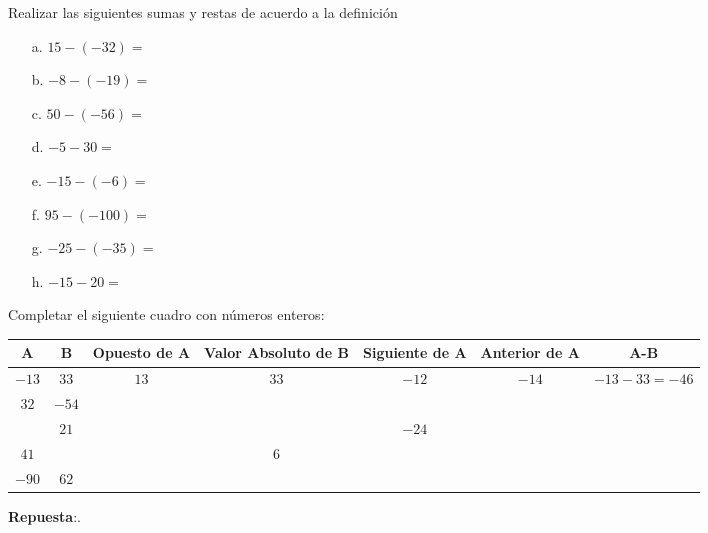 \documentclass[10pt]{examdesign}
\begin{document}
    \begin{fillin}[title={\textbf{Calculos de sumas y restas...}}, resetcounter=no, rearrange=no]
    	\begin{question}
    		Realizar las siguientes sumas y restas de acuerdo a la definición
    		\begin{itemize}
    			\item [a.] $15-(-32)=$
    			\item [b.] $-8-(-19)=$
    			\item [c.] $50-(-56)=$
    			\item [d.] $-5-30=$
    			\item [e.] $-15-(-6)=$
    			\item [f.] $95-(-100)=$
    			\item [g.] $-25-(-35)=$
    			\item [h.] $-15-20=$ 
    		\end{itemize}
    	\end{question}	        	
    \end{fillin}

    \begin{shortanswer}[title={\textbf{Repasamos algunos conceptos...}},
    	rearrange=no,resetcounter=no]
    	
    	
    	\begin{question}
    		Completar el siguiente cuadro con números enteros:
    		
    		\begin{tabular}{|c|c|c|c|c|c|c|}
    			\hline
    			\textbf{A}&\textbf{B}&\textbf{Opuesto de A}&\textbf{Valor Absoluto de B}&\textbf{Siguiente de A}& \textbf{Anterior de A}&\textbf{A-B}
    			\\\hline
    			  $-13$          & $33$  & $13$  &  $33$ & $-12$ & $-14$ & $-13-33=-46$ 
    			\\\hline
    			  $32$           & $-54$ &       &       &       &  &
    			\\\hline
    			                 & $21$  &       &       & $-24$ &  &
    			\\\hline
    			  $41$           &       &       & $6$   &       &  &
    			\\\hline
    			$-90$            & $62$  &       &       &       &  &
    			\\\hline
    		\end{tabular}
    	
    		\begin{answer}
    			\textbf{Repuesta}:.
    		\end{answer}
    	\end{question}        
    \end{shortanswer}
     
  
    
\end{document}
